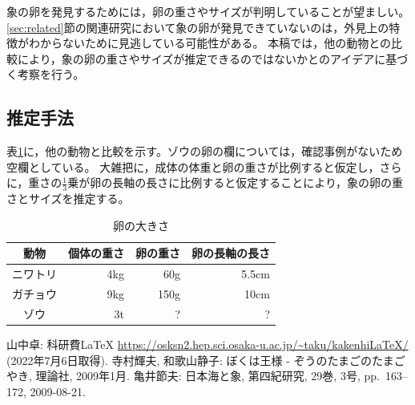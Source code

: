 \documentclass[dvipdfmx]{jsarticle}
\begin{document}
象の卵を発見するためには，卵の重さやサイズが判明していることが望ましい。
\ref{sec:related}節の関連研究において象の卵が発見できていないのは，外見上の特徴がわからないために見逃している可能性がある。 %
本稿では，他の動物との比較により，象の卵の重さやサイズが推定できるのではないかとのアイデアに基づく考察を行う。

\subsection{推定手法}

表\ref{tab:egg_sizes}に，他の動物と比較を示す。ゾウの卵の欄については，確認事例がないため空欄としている。 %
大雑把に，成体の体重と卵の重さが比例すると仮定し，さらに，重さの$\frac{1}{3}$乗が卵の長軸の長さに比例すると仮定することにより，象の卵の重さとサイズを推定する。

\begin{table}[htbp]
  \centering
  \caption{卵の大きさ}
  \label{tab:egg_sizes} %
  \begin{tabular}{|c|r|r|r|}
    \hline
    動物 & 個体の重さ & 卵の重さ & 卵の長軸の長さ \\ \hline \hline
    ニワトリ & 4kg & 60g & 5.5cm \\ \hline
    ガチョウ & 9kg & 150g & 10cm \\ \hline
    ゾウ & 3t & ? & ? \\ \hline
  \end{tabular}
\end{table}


 {} %
\label{sec:biblio}
\begin{thebibliography}{99} %
 山中卓: 科研費LaTeX \url{https://osksn2.hep.sci.osaka-u.ac.jp/~taku/kakenhiLaTeX/} (2022年7月6日取得). %
 寺村輝夫, 和歌山静子: ぼくは王様 - ぞうのたまごのたまごやき, 理論社, 2009年1月. %
 亀井節夫: 日本海と象, 第四紀研究, 29巻, 3号, pp.~163--172, 2009-08-21. %
\end{thebibliography}
\end{document}
